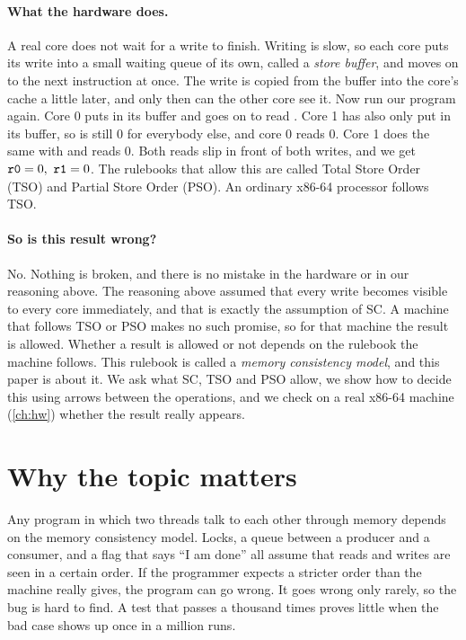 \paragraph{What the hardware does.} A real core does not wait for a write to finish. Writing is slow, so each core puts its write into a small waiting queue of its own, called a \emph{store buffer}, and moves on to the next instruction at once. The write is copied from the buffer into the core's cache a little later, and only then can the other core see it. Now run our program again. Core 0 puts  in its buffer and goes on to read . Core 1 has also only put  in its buffer, so  is still 0 for everybody else, and core 0 reads 0. Core 1 does the same with  and reads 0. Both reads slip in front of both writes, and we get $\texttt{r0} = 0,\ \texttt{r1} = 0$. The rulebooks that allow this are called Total Store Order (TSO) and Partial Store Order (PSO). An ordinary x86-64 processor follows TSO.

\paragraph{So is this result wrong?} No. Nothing is broken, and there is no mistake in the hardware or in our reasoning above. The reasoning above assumed that every write becomes visible to every core immediately, and that is exactly the assumption of SC. A machine that follows TSO or PSO makes no such promise, so for that machine the result is allowed. Whether a result is allowed or not depends on the rulebook the machine follows. This rulebook is called a \emph{memory consistency model}, and this paper is about it. We ask what SC, TSO and PSO allow, we show how to decide this using arrows between the operations, and we check on a real x86-64 machine (\cref{ch:hw}) whether the result really appears.

\section{Why the topic matters}
\label{sec:topic}

Any program in which two threads talk to each other through memory depends on the memory consistency model. Locks, a queue between a producer and a consumer, and a flag that says ``I am done'' all assume that reads and writes are seen in a certain order. If the programmer expects a stricter order than the machine really gives, the program can go wrong. It goes wrong only rarely, so the bug is hard to find. A test that passes a thousand times proves little when the bad case shows up once in a million runs.

